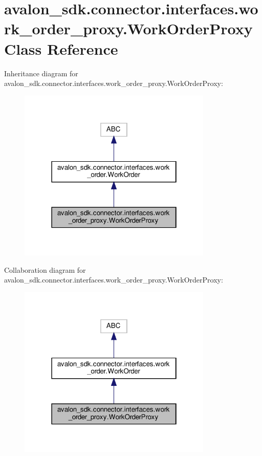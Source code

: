 \hypertarget{classavalon__sdk_1_1connector_1_1interfaces_1_1work__order__proxy_1_1WorkOrderProxy}{}\section{avalon\+\_\+sdk.\+connector.\+interfaces.\+work\+\_\+order\+\_\+proxy.\+Work\+Order\+Proxy Class Reference}
\label{classavalon__sdk_1_1connector_1_1interfaces_1_1work__order__proxy_1_1WorkOrderProxy}


Inheritance diagram for avalon\+\_\+sdk.\+connector.\+interfaces.\+work\+\_\+order\+\_\+proxy.\+Work\+Order\+Proxy\+:
\nopagebreak
\begin{figure}[H]
\begin{center}
\leavevmode
\includegraphics[width=262pt]{classavalon__sdk_1_1connector_1_1interfaces_1_1work__order__proxy_1_1WorkOrderProxy__inherit__graph}
\end{center}
\end{figure}


Collaboration diagram for avalon\+\_\+sdk.\+connector.\+interfaces.\+work\+\_\+order\+\_\+proxy.\+Work\+Order\+Proxy\+:
\nopagebreak
\begin{figure}[H]
\begin{center}
\leavevmode
\includegraphics[width=262pt]{classavalon__sdk_1_1connector_1_1interfaces_1_1work__order__proxy_1_1WorkOrderProxy__coll__graph}
\end{center}
\end{figure}
